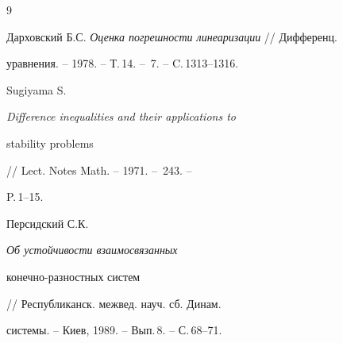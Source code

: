 \begin{thebibliography}{9}







Дарховский Б.С. {\em Оценка погрешности линеаризации} // Дифференц.


уравнения. -- 1978. -- Т.\,14. -- \No\,7. -- C.\,1313--1316.




Sugiyama S. {\em Difference inequalities and their applications to


stability problems} // Lect. Notes Math. -- 1971. -- \No\,243. --


P.\,1--15.




Персидский С.К. {\em Об устойчивости взаимосвязанных


конечно-разностных систем} // Республиканск. межвед. науч. сб. Динам.


системы. -- Киев, 1989. -- Вып.\,8. -- С.\,68--71.





\end{thebibliography}





\vskip 2cm














\label{end}





